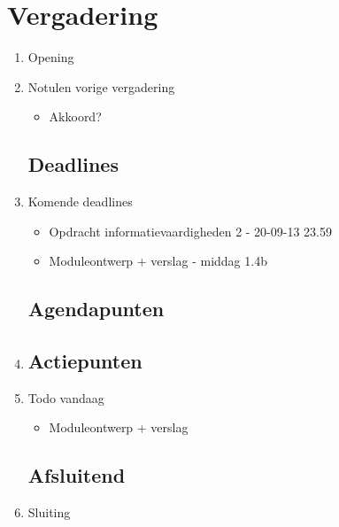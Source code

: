 \documentclass{article}
\begin{document}
\section*{Vergadering}
\begin{enumerate}
	
	\subsection*{Vooraf}
	\item Opening
	\item Notulen vorige vergadering
	\begin{itemize}
		\item Akkoord?
	\end{itemize}
	\subsection*{Deadlines}
	\item Komende deadlines
	\begin{itemize}
		\item Opdracht informatievaardigheden 2 - 20-09-13 23.59
		\item Moduleontwerp + verslag - middag 1.4b
	\end{itemize}

	\subsection*{Agendapunten}
	\item
	
	\subsection*{Actiepunten}
	\item Todo vandaag
	\begin{itemize}
		\item Moduleontwerp + verslag
	\end{itemize}

	\noindent 
	\subsection*{Afsluitend}
	\item Sluiting

\end{enumerate}
\end{document}
